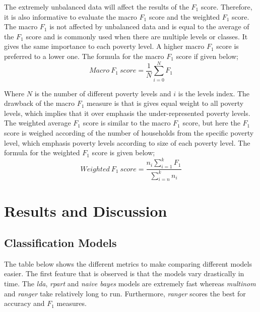 \documentclass[11pt,preprint, authoryear]{elsarticle}
\numberwithin{equation}{section}
\numberwithin{figure}{section}
\numberwithin{table}{section}
\begin{document}
The extremely unbalanced data will affect the results of the \(F_1\)
score. Therefore, it is also informative to evaluate the macro \(F_1\)
score and the weighted \(F_1\) score. The macro \(F_1\) is not affected
by unbalanced data and is equal to the average of the \(F_1\) score and
is commonly used when there are multiple levels or classes. It gives the
same importance to each poverty level. A higher macro \(F_1\) score is
preferred to a lower one. The formula for the macro \(F_1\) score if
given below; \[ Macro\: F_1\: score = \frac{1}{N}{\sum}_{i=0}^N F_1\]

Where \(N\) is the number of different poverty levels and \(i\) is the
levels index. The drawback of the macro \(F_1\) measure is that is gives
equal weight to all poverty levels, which implies that it over emphasis
the under-represented poverty levels. The weighted average \(F_1\) score
is similar to the macro \(F_1\) score, but here the \(F_1\) score is
weighed according of the number of households from the specific poverty
level, which emphasis poverty levels according to size of each poverty
level. The formula for the weighted \(F_1\) score is given below;
\[ Weighted\: F_1\: score = \frac{n_i\sum_{i=1}^k F_1}{\sum_{i=n}^k n_i}\]

\hypertarget{results-and-discussion}{%
\section{Results and Discussion}\label{results-and-discussion}}

\hypertarget{classification-models}{%
\subsection{Classification Models}\label{classification-models}}

The table below shows the different metrics to make comparing different
models easier. The first feature that is observed is that the models
vary drastically in time. The \emph{lda}, \emph{rpart} and
\emph{naive bayes} models are extremely fast whereas \emph{multinom} and
\emph{ranger} take relatively long to run. Furthermore, \emph{ranger}
scores the best for accuracy and \(F_1\) measures.
\end{document}
